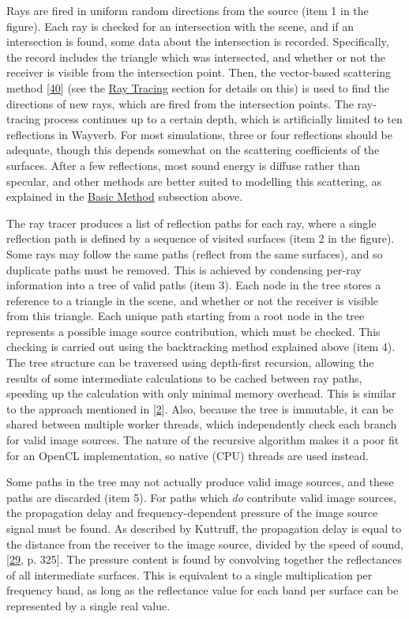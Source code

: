 \documentclass[]{scrreprt}
\begin{document}
Rays are fired in uniform random directions from the source (item 1 in
the figure). Each ray is checked for an intersection with the scene, and
if an intersection is found, some data about the intersection is
recorded. Specifically, the record includes the triangle which was
intersected, and whether or not the receiver is visible from the
intersection point. Then, the vector-based scattering method
{[}\protect\hyperlink{ref-christensenux5fnewux5f2005}{40}{]} (see the
\href{\%7B\%7B\%20site.baseurl\%20\%7D\%7D\%7B\%\%20link\%20ray_tracer.md\%20\%\%7D}{Ray
Tracing} section for details on this) is used to find the directions of
new rays, which are fired from the intersection points. The ray-tracing
process continues up to a certain depth, which is artificially limited
to ten reflections in Wayverb. For most simulations, three or four
reflections should be adequate, though this depends somewhat on the
scattering coefficients of the surfaces. After a few reflections, most
sound energy is diffuse rather than specular, and other methods are
better suited to modelling this scattering, as explained in the
\protect\hyperlink{basic-method}{Basic Method} subsection above.

The ray tracer produces a list of reflection paths for each ray, where a
single reflection path is defined by a sequence of visited surfaces
(item 2 in the figure). Some rays may follow the same paths (reflect
from the same surfaces), and so duplicate paths must be removed. This is
achieved by condensing per-ray information into a tree of valid paths
(item 3). Each node in the tree stores a reference to a triangle in the
scene, and whether or not the receiver is visible from this triangle.
Each unique path starting from a root node in the tree represents a
possible image source contribution, which must be checked. This checking
is carried out using the backtracking method explained above (item 4).
The tree structure can be traversed using depth-first recursion,
allowing the results of some intermediate calculations to be cached
between ray paths, speeding up the calculation with only minimal memory
overhead. This is similar to the approach mentioned in
{[}\protect\hyperlink{ref-saviojaux5foverviewux5f2015}{2}{]}. Also,
because the tree is immutable, it can be shared between multiple worker
threads, which independently check each branch for valid image sources.
The nature of the recursive algorithm makes it a poor fit for an OpenCL
implementation, so native (CPU) threads are used instead.

Some paths in the tree may not actually produce valid image sources, and
these paths are discarded (item 5). For paths which \emph{do} contribute
valid image sources, the propagation delay and frequency-dependent
pressure of the image source signal must be found. As described by
Kuttruff, the propagation delay is equal to the distance from the
receiver to the image source, divided by the speed of sound,
{[}\protect\hyperlink{ref-kuttruffux5froomux5f2009}{29}, p. 325{]}. The
pressure content is found by convolving together the reflectances of all
intermediate surfaces. This is equivalent to a single multiplication per
frequency band, as long as the reflectance value for each band per
surface can be represented by a single real value.
\end{document}
